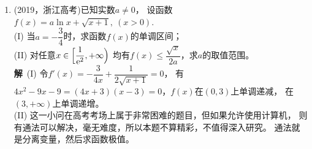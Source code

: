 \begin{enumerate}[label={【\textbf{例\thechapter.\arabic*}】},
 leftmargin=\inteval{\myenumleftmargin}pt,
 itemsep=\inteval{\myenumitempsep}pt,
 itemindent=\inteval{\myenumitemindent}pt]
令$ \ln\sqrt{2}=\ln(b-1+\sqrt{b^2-2b}) $，解得$ b=\dfrac{4+3\sqrt{2}}{4} $.那么当$ b=\dfrac{4+3\sqrt{2}}{4} $时，
$ g(x) $在$ (0,\ln\sqrt{2}) $上单调递减，
\begin{gather*}
    g(\ln\sqrt{2})=-\dfrac{3}{2}-2\sqrt{2}+(3\sqrt{2}-2)
    \ln 2<g(0)=0 \\
    \ln 2<\dfrac{18+\sqrt{2}}{18}<0.6934
\end{gather*}
所以，$ \ln 2 $的近似值为$ 0.693 $. \\
\textbf{注}\ 面对第(III)问，首先容易想到的是$ f(\ln\sqrt{2})=\dfrac{\sqrt{2}}{2}
-\ln 2>0 $，$ \ln 2<\dfrac{\sqrt{2}}{2}<0.70715 $，这个数字太大了，
根本达不到$ 0.001 $的精度。为何利用$ g(x) $就能提高估算精度呢？
这是因为，当$ |x| $很小时，$ g(x) $比$ f(x) $更贴近$ x $轴。
\begin{figure}[!ht]
    \centering
    \texttt{[image: 2014新课标全国II卷]}
\end{figure}

$ f(2x) $在原点处的5次泰勒展开为$ \dfrac{8}{3}x^3+\dfrac{8}{15}x^5 $；
当$ b=2 $时，$ 8f(x) $在原点处的5次泰勒展开为$ \dfrac{8}{3}x^3
+\dfrac{2}{15}x^5 $，所以，$ b=2 $的效果就是让$ f(2x)-4bf(x) $
在原点处的泰勒展开没有3次项。

\item (2019，浙江高考)已知实数$ a\neq 0 $，
设函数$ f(x)=a\ln x+\sqrt{x+1},\ (x>0) $.\\
(I) 当$ a=-\dfrac{3}{4} $时，求函数$ f(x) $的单调区间；\\
(II) 对任意$ x\in \Big[\dfrac{1}{\mathrm{e}^2},+\infty\Big) $
均有$ f(x)\leq \dfrac{\sqrt{x}}{2a} $，求$ a $的取值范围。\\
\textbf{解}\ (I) 令$ f'(x)=-\dfrac{3}{4x}+\dfrac{1}{2\sqrt{x+1}}=0 $，
有$ 4x^2-9x-9=(4x+3)(x-3)=0 $，$ f(x) $在$ (0,3) $上单调递减，
在$ (3,+\infty) $上单调递增。\\
(II) 这一小问在高考考场上属于非常困难的题目，但如果允许使用计算机，
则有通法可以解决，毫无难度，所以本题不算精彩，不值得深入研究。
通法就是分离变量，然后求函数极值。


\end{enumerate}
